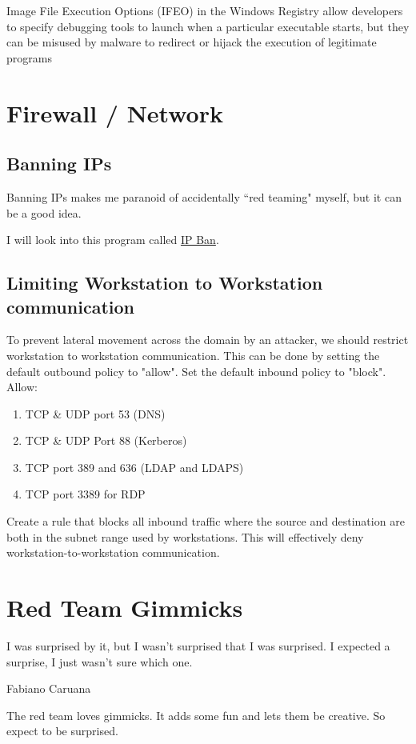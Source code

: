 \documentclass{article}
\begin{document}
Image File Execution Options (IFEO) in the Windows Registry allow 
developers to specify debugging tools to launch when a particular 
executable starts, but they can be misused by malware to redirect 
or hijack the execution of legitimate programs

\section{Firewall / Network}
\subsection{Banning IPs}
Banning IPs makes me paranoid of accidentally ``red teaming" myself, but it can be a good idea.

I will look into this program called \href{https://github.com/DigitalRuby/IPBan}{IP Ban}.

\subsection{Limiting Workstation to Workstation communication}
To prevent lateral movement across the domain by an attacker, we should restrict workstation to workstation communication.
This can be done by setting the default outbound policy to "allow".
Set the default inbound policy to "block".
Allow:
\begin{enumerate}
    \item TCP \& UDP port 53 (DNS)
    \item TCP \& UDP Port 88 (Kerberos)
    \item TCP port 389 and 636 (LDAP and LDAPS)
    \item TCP port 3389 for RDP
\end{enumerate}

Create a rule that blocks all inbound traffic where the source and destination are both in the subnet range used by workstations. 
This will effectively deny workstation-to-workstation communication.


\section{Red Team Gimmicks}
\epigraph{I was surprised by it, but I wasn’t surprised that I was surprised. I expected a surprise, I just wasn’t sure which one.}
{Fabiano Caruana}

The red team loves gimmicks. It adds some fun and lets them be creative. So expect to be surprised.
\end{document}
